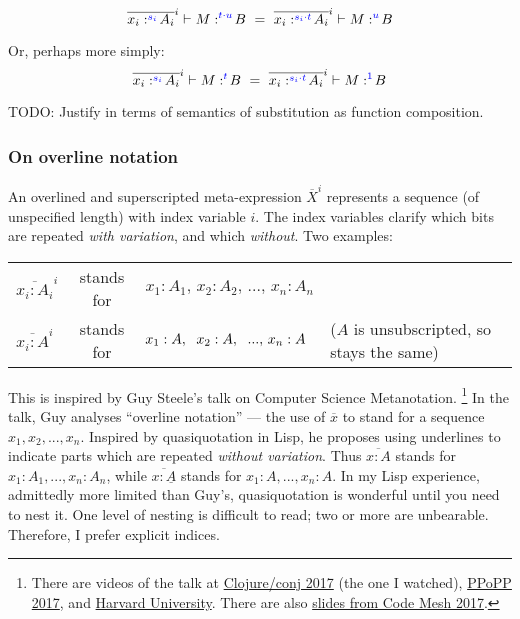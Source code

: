 \documentclass{article}
\newcommand{\todo}[1]{{\color{red}#1}}
\newcommand{\tm}{\ensuremath{1}}     %
\newcommand{\tc}{\cdot}         %
\newcommand{\h}[3]{#1 :^{#3}\! {#2}}
\begin{document}
\newcommand{\hilited}{\color{blue}}

\begin{equation}
  \overline{\h{x_i}{A_i}{\hilited s_i}}^i \vdash \h{M}{B}{\hilited t \tc u}
  ~=~
  \overline{\h{x_i}{A_i}{\hilited s_i \tc t}}^i
  \vdash \h{M}{B}{\hilited u}
\end{equation}

Or, perhaps more simply:
\begin{equation}
  \overline{\h{x_i}{A_i}{\hilited s_i}}^i \vdash \h{M}{B}{\hilited t}
  ~=~
  \overline{\h{x_i}{A_i}{\hilited s_i \tc t}}^i
  \vdash \h{M}{B}{\hilited\tm}
\end{equation}

\todo{TODO: Justify in terms of semantics of substitution as function
  composition.}

\subsubsection{On overline notation}

An overlined and superscripted meta-expression $\overline{X}^i$ represents a
sequence (of unspecified length) with index variable $i$. The index variables
clarify which bits are repeated \emph{with variation}, and which \emph{without}.
Two examples:

\begin{center}
  \begin{tabular}{lcll}
    $\overline{x_i : A_i}^i$ & stands for
    & $x_1 : A_1,\, x_2 : A_2,\, ...,\, x_n : A_n$
    \\
    $\overline{x_i : A}^i$ & stands for
    & $x_1 : A,\hspace{0.6em} x_2 : A,\hspace{0.6em} ...,\, x_n : A$
    & ($A$ is unsubscripted, so stays the same)
  \end{tabular}
\end{center}

This is inspired by Guy Steele's talk on Computer Science Metanotation.%
\footnote{There are videos of the talk at
  \href{https://www.youtube.com/watch?v=dCuZkaaou0Q}{Clojure/conj 2017} (the one
  I watched), \href{https://www.youtube.com/watch?v=7HKbjYqqPPQ}{PPoPP 2017},
  and
  \href{https://www.youtube.com/watch?v=8fCfkGFF7X8&feature=youtu.be&t=37m46s}{Harvard
    University}. There are also
  \href{http://s3.amazonaws.com/erlang-conferences-production/media/files/000/000/755/original/Guy_L._Steele_-_A_Cobbler's_Child.pdf?1510053539}{slides
    from Code Mesh 2017}.}
In the talk, Guy analyses ``overline notation'' --- the use of $\overline{x}$ to
stand for a sequence $x_1, x_2, ..., x_n$.
Inspired by quasiquotation in Lisp, he proposes using underlines to indicate
parts which are repeated \emph{without variation}. Thus $\overline{x : A}$
stands for $x_1 : A_1, ..., x_n : A_n$, while $\overline{x : \underline{A}}$
stands for $x_1 : A, ..., x_n : A$.
In my Lisp experience, admittedly more limited than Guy's, quasiquotation is
wonderful until you need to nest it. One level of nesting is difficult to read;
two or more are unbearable. Therefore, I prefer explicit indices.
\end{document}
